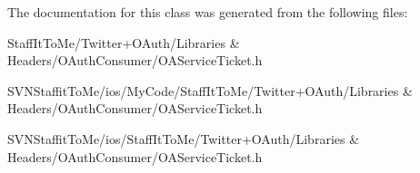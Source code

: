 \-The documentation for this class was generated from the following files\-:\begin{DoxyCompactItemize}
\item 
\-Staff\-It\-To\-Me/\-Twitter+\-O\-Auth/\-Libraries \& Headers/\-O\-Auth\-Consumer/\-O\-A\-Service\-Ticket.\-h\item 
\-S\-V\-N\-Staffit\-To\-Me/ios/\-My\-Code/\-Staff\-It\-To\-Me/\-Twitter+\-O\-Auth/\-Libraries \& Headers/\-O\-Auth\-Consumer/\-O\-A\-Service\-Ticket.\-h\item 
\-S\-V\-N\-Staffit\-To\-Me/ios/\-Staff\-It\-To\-Me/\-Twitter+\-O\-Auth/\-Libraries \& Headers/\-O\-Auth\-Consumer/\-O\-A\-Service\-Ticket.\-h\end{DoxyCompactItemize}

